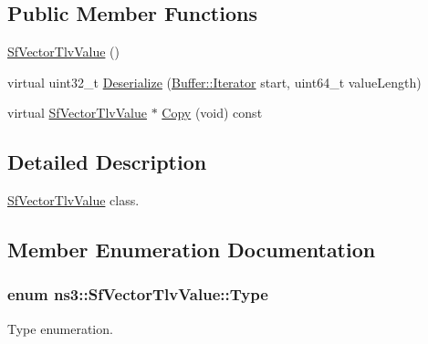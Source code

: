 \subsection*{Public Member Functions}
\begin{DoxyCompactItemize}
\item 
\hyperlink{classns3_1_1SfVectorTlvValue_a73f5035aee50b81fe463de2712f06f63}{Sf\+Vector\+Tlv\+Value} ()
\item 
virtual uint32\+\_\+t \hyperlink{classns3_1_1SfVectorTlvValue_afc34c4c61724940c485be32168137ac9}{Deserialize} (\hyperlink{classns3_1_1Buffer_1_1Iterator}{Buffer\+::\+Iterator} start, uint64\+\_\+t value\+Length)
\item 
virtual \hyperlink{classns3_1_1SfVectorTlvValue}{Sf\+Vector\+Tlv\+Value} $\ast$ \hyperlink{classns3_1_1SfVectorTlvValue_a08a3cb4169240393ceecaf55620188fa}{Copy} (void) const 
\end{DoxyCompactItemize}


\subsection{Detailed Description}
\hyperlink{classns3_1_1SfVectorTlvValue}{Sf\+Vector\+Tlv\+Value} class. 

\subsection{Member Enumeration Documentation}
\subsubsection[{\texorpdfstring{Type}{Type}}]{\setlength{\rightskip}{0pt plus 5cm}enum {\bf ns3\+::\+Sf\+Vector\+Tlv\+Value\+::\+Type}}\hypertarget{classns3_1_1SfVectorTlvValue_aa23ab5c7acfce609dbfe28024c6d2ef7}{}\label{classns3_1_1SfVectorTlvValue_aa23ab5c7acfce609dbfe28024c6d2ef7}


Type enumeration. 

